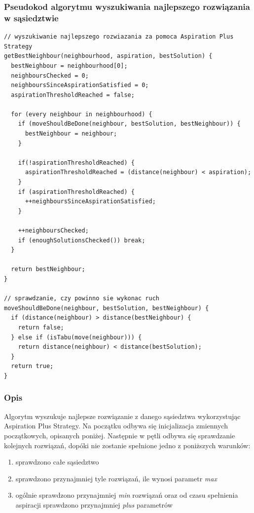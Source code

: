 \documentclass[11pt,a4paper]{article}
\begin{document}
\subsubsection{Pseudokod algorytmu wyszukiwania najlepszego rozwiązania w sąsiedztwie}
\begin{lstlisting}[caption = Pseudokod algorytmu wyszukiwania najlepszego rozwiązania w sąsiedztwie]
// wyszukiwanie najlepszego rozwiazania za pomoca Aspiration Plus Strategy
getBestNeighbour(neighbourhood, aspiration, bestSolution) {
  bestNeighbour = neighbourhood[0];
  neighboursChecked = 0;
  neighboursSinceAspirationSatisfied = 0;
  aspirationThresholdReached = false;

  for (every neighbour in neighbourhood) {
    if (moveShouldBeDone(neighbour, bestSolution, bestNeighbour)) {
      bestNeighbour = neighbour;
    }

    if(!aspirationThresholdReached) {
      aspirationThresholdReached = (distance(neighbour) < aspiration);
    }
    if (aspirationThresholdReached) {
      ++neighboursSinceAspirationSatisfied;
    }

    ++neighboursChecked;
    if (enoughSolutionsChecked()) break;
  }

  return bestNeighbour;
}

// sprawdzanie, czy powinno sie wykonac ruch
moveShouldBeDone(neighbour, bestSolution, bestNeighbour) {
  if (distance(neighbour) > distance(bestNeighbour) {
    return false;
  } else if (isTabu(move(neighbour))) {
    return distance(neighbour) < distance(bestSolution);
  }
  return true;
}
\end{lstlisting}

\subsubsection{Opis}
Algorytm wyszukuje najlepsze rozwiązanie z danego sąsiedztwa wykorzystując Aspiration Plus Strategy. Na początku odbywa się inicjalizacja zmiennych początkowych, opisanych poniżej. Następnie w pętli odbywa się sprawdzanie kolejnych rozwiązań, dopóki nie zostanie spełnione jedno z poniższych warunków:
\begin{enumerate}
  \item sprawdzono całe sąsiedztwo
  \item sprawdzono przynajmniej tyle rozwiązań, ile wynosi parametr \textit{max}
  \item ogólnie sprawdzono przynajmniej \textit{min} rozwiązań oraz od czasu spełnienia aspiracji sprawdzono przynajmniej \textit{plus} parametrów
\end{enumerate}
\end{document}
